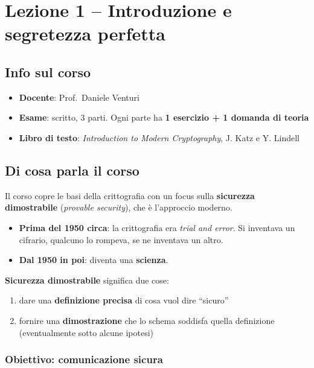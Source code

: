 
\chapter{Lezione 1 -- Introduzione e segretezza perfetta}

\section{Info sul corso}

\begin{itemize}
\tightlist
\item
  \textbf{Docente}: Prof.~Daniele Venturi
\item
  \textbf{Esame}: scritto, 3 parti. Ogni parte ha \textbf{1 esercizio + 1 domanda di teoria}
\item
  \textbf{Libro di testo}: \emph{Introduction to Modern Cryptography}, J. Katz e Y. Lindell
\end{itemize}

\section{Di cosa parla il corso}

Il corso copre le basi della crittografia con un focus sulla \textbf{sicurezza dimostrabile} (\emph{provable security}), che è l'approccio moderno.

\begin{itemize}
\tightlist
\item
  \textbf{Prima del 1950 circa}: la crittografia era \emph{trial and error}. Si inventava un cifrario, qualcuno lo rompeva, se ne inventava un altro.
\item
  \textbf{Dal 1950 in poi}: diventa una \textbf{scienza}.
\end{itemize}

\textbf{Sicurezza dimostrabile} significa due cose:

\begin{enumerate}
\def\labelenumi{\arabic{enumi}.}
\tightlist
\item
  dare una \textbf{definizione precisa} di cosa vuol dire ``sicuro''
\item
  fornire una \textbf{dimostrazione} che lo schema soddisfa quella definizione (eventualmente sotto alcune ipotesi)
\end{enumerate}

\subsection{Obiettivo: comunicazione sicura}

